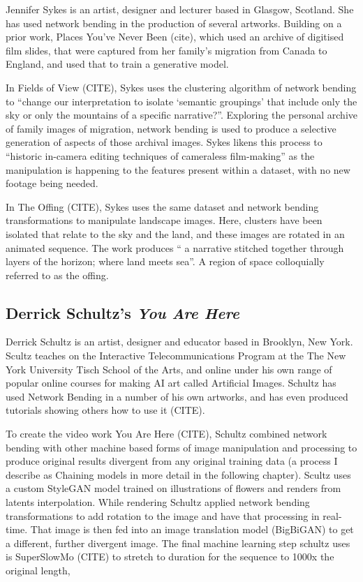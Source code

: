 Jennifer Sykes is an artist, designer and lecturer based in Glasgow, Scotland. 
She has used network bending in the production of several artworks. Building on a prior work, Places You’ve Never Been (cite), which used an archive of digitised film slides, that were captured from her family's migration from Canada to England, and used that to train a generative model. 

In Fields of View (CITE), Sykes uses the clustering algorithm of network bending to “change our interpretation to isolate ‘semantic groupings’ that include only the sky or only the mountains of a specific narrative?”. 
Exploring the personal archive of family images of migration, network bending is used to produce a selective generation of aspects of those archival images. 
Sykes likens this process to “historic in-camera editing techniques of cameraless film-making” as the manipulation is happening to the features present within a dataset, with no new footage being needed.

In The Offing (CITE), Sykes uses the same dataset and network bending transformations to manipulate landscape images. 
Here, clusters have been isolated that relate to the sky and the land, and these images are rotated in an animated sequence. 
The work produces “ a narrative stitched together through layers of the horizon; where land meets sea”. 
A region of space colloquially referred to as the offing. 

\subsection{Derrick Schultz's \textit{You Are Here}}

Derrick Schultz is an artist, designer and educator based in Brooklyn, New York. Scultz teaches on the Interactive Telecommunications Program at the The New York University Tisch School of the Arts, and online under his own range of popular online courses for making AI art called Artificial Images. 
Schultz has used Network Bending in a number of his own artworks, and has even produced tutorials showing others how to use it (CITE). 

To create the video work You Are Here (CITE), Schultz combined network bending with other machine based forms of image manipulation and processing to produce original results divergent from any original training data (a process I describe as Chaining models in more detail in the following chapter). 
Scultz uses a custom StyleGAN model trained on illustrations of flowers and renders from latents interpolation. 
While rendering Schultz applied network bending transformations to add rotation to the image and have that processing in real-time. 
That image is then fed into an image translation model (BigBiGAN) to get a different, further divergent image. 
The final machine learning step schultz uses is SuperSlowMo (CITE) to stretch to duration for the sequence to 1000x the original length,

